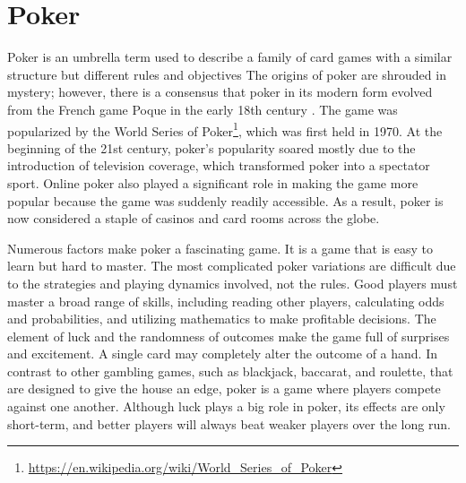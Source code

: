 \section{Poker}
\label{sec:poker}
Poker is an umbrella term used to describe a family of card games with a similar structure but different rules and objectives
The origins of poker are shrouded in mystery; however, there is a consensus \cite{roya_2021} that poker in its modern form evolved from the French game Poque in the early 18th century \cite{williamson2012frontier}.
The game was popularized by the World Series of Poker\footnote{\url{https://en.wikipedia.org/wiki/World_Series_of_Poker}}, which was first held in 1970. At the beginning of the 21st century, poker's popularity soared mostly due to the introduction of television coverage, which transformed poker into a spectator sport. Online poker also played a significant role in making the game more popular because the game was suddenly readily accessible. As a result, poker is now considered a staple of casinos and card rooms across the globe.

Numerous factors make poker a fascinating game. It is a game that is easy to learn but hard to master. The most complicated poker variations are difficult due to the strategies and playing dynamics involved, not the rules. Good players must master a broad range of skills, including reading other players, calculating odds and probabilities, and utilizing mathematics to make profitable decisions. The element of luck and the randomness of outcomes make the game full of surprises and excitement. A single card may completely alter the outcome of a hand. In contrast to other gambling games, such as blackjack, baccarat, and roulette, that are designed to give the house an edge, poker is a game where players compete against one another. Although luck plays a big role in poker, its effects are only short-term, and better players will always beat weaker players over the long run.

